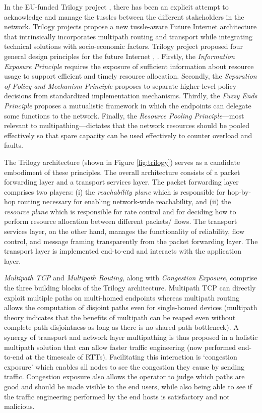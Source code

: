\documentclass[10pt]{IEEEtran}
\begin{document}
In the EU-funded Trilogy project \cite{abt2009trilogy}, there has been an explicit attempt to acknowledge and manage the tussles between the different stakeholders in the network. Trilogy projects propose a new tussle-aware  Future Internet architecture that intrinsically incorporates multipath routing and transport while integrating technical solutions with socio-economic factors. Trilogy project proposed four general design principles for the future Internet \cite{ICT216372}, \cite{ford2009new}. Firstly, the \textit{Information Exposure Principle} requires the exposure of sufficient information about resource usage to support efficient and timely resource allocation. Secondly, the \textit{Separation of Policy and Mechanism Principle} proposes to separate higher-level policy decisions from standardized implementation mechanisms. Thirdly, the \textit{Fuzzy Ends Principle} proposes a mutualistic framework in which the  endpoints can delegate some functions to the network. Finally, the \textit{Resource Pooling Principle}---most relevant to multipathing---dictates that the network resources should be pooled effectively so that spare capacity can be used effectively to counter overload and faults.

The Trilogy architecture (shown in Figure \ref{fig:trilogy}) serves as a candidate embodiment of these principles. The overall architecture consists of a packet forwarding layer and a transport services layer. The packet forwarding layer comprises two players: (i) the \textit{reachability plane} which is responsible for hop-by-hop routing necessary for enabling network-wide reachability, and (ii) the \textit{resource plane} which is responsible for rate control and for deciding how to perform resource allocation between different packets/ flows. The transport services layer, on the other hand, manages the functionality of reliability, flow control, and message framing transparently from the packet forwarding layer. The transport layer is implemented end-to-end and interacts with the application layer. 





\textit{Multipath TCP} and \textit{Multipath Routing}, along with \textit{Congestion Exposure}, comprise the three building blocks of the Trilogy architecture.  Multipath TCP can directly exploit multiple paths on multi-homed endpoints whereas multipath routing allows the computation of disjoint paths even for single-homed devices (multipath theory indicates that the benefits of multipath can be reaped even without complete path disjointness as long as there is no shared path bottleneck). A synergy of transport and network layer multipathing is thus proposed in a holistic multipath solution that can allow faster traffic engineering (now performed end-to-end at the timescale of RTTs). Facilitating this interaction is `congestion exposure' which enables all nodes to see the congestion they cause by sending traffic. Congestion exposure also allows the operator to judge which paths are good and should be made visible to the end users, while also being able to see if the traffic engineering performed by the end hosts is satisfactory and not malicious. 
\end{document}
